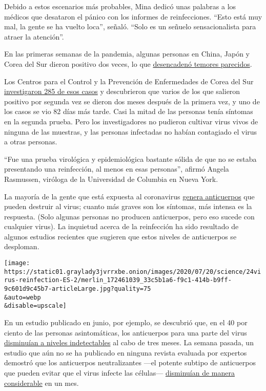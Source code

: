 Debido a estos escenarios más probables, Mina dedicó unas palabras a los
médicos que desataron el pánico con los informes de reinfecciones.
``Esto está muy mal, la gente se ha vuelto loca'', señaló. ``Solo es un
señuelo sensacionalista para atraer la atención''.

En las primeras semanas de la pandemia, algunas personas en China, Japón
y Corea del Sur dieron positivo dos veces, lo que
\href{https://www.nytimes3xbfgragh.onion/2020/02/29/health/coronavirus-reinfection.html}{desencadenó
temores parecidos}.

Los Centros para el Control y la Prevención de Enfermedades de Corea del
Sur
\href{https://www.cdc.go.kr/board/board.es?mid=a30402000000\&bid=0030}{investigaron
285 de esos casos} y descubrieron que varios de los que salieron
positivo por segunda vez se dieron dos meses después de la primera vez,
y uno de los casos se vio 82 días más tarde. Casi la mitad de las
personas tenía síntomas en la segunda prueba. Pero los investigadores no
pudieron cultivar virus vivos de ninguna de las muestras, y las personas
infectadas no habían contagiado el virus a otras personas.

``Fue una prueba virológica y epidemiológica bastante sólida de que no
se estaba presentando una reinfección, al menos en esas personas'',
afirmó Angela Rasmussen, viróloga de la Universidad de Columbia en Nueva
York.

La mayoría de la gente que está expuesta al coronavirus
\href{https://www.nytimes3xbfgragh.onion/2020/05/07/health/coronavirus-antibody-prevalence.html}{genera
anticuerpos} que pueden destruir al virus; cuanto más graves son los
síntomas, más intensa es la respuesta. (Solo algunas personas no
producen anticuerpos, pero eso sucede con cualquier virus). La inquietud
acerca de la reinfección ha sido resultado de algunos estudios recientes
que sugieren que estos niveles de anticuerpos se desploman.

\texttt{[image: https://static01.graylady3jvrrxbe.onion/images/2020/07/20/science/24virus-reinfection-ES-2/merlin\_172461039\_33c5b1a6-f9c1-414b-b9ff-9c601d9c45b7-articleLarge.jpg?quality=75\\\&auto=webp\\\&disable=upscale]}

En un estudio publicado en junio, por ejemplo, se descubrió que, en el
40 por ciento de las personas asintomáticas, los anticuerpos para una
parte del virus
\href{https://www.nytimes3xbfgragh.onion/2020/06/18/health/coronavirus-antibodies.html}{disminuían
a niveles indetectables} al cabo de tres meses. La semana pasada, un
estudio que aún no se ha publicado en ninguna revista evaluada por
expertos demostró que los anticuerpos neutralizantes ---el potente
subtipo de anticuerpos que pueden evitar que el virus infecte las
células---
\href{https://www.medrxiv.org/content/10.1101/2020.07.09.20148429v1}{disminuían
de manera considerable} en un mes.

